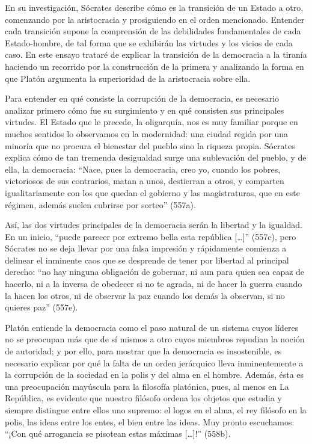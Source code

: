 En su investigación, Sócrates describe cómo
es la transición de un Estado a otro,
comenzando por la aristocracia y prosiguiendo
en el orden mencionado. Entender cada
transición supone la comprensión de las
debilidades fundamentales de cada
Estado-hombre, de tal forma que se exhibirán
las virtudes y los vicios de cada caso. En
este ensayo trataré de explicar la transición
de la democracia a la tiranía haciendo un
recorrido por la construcción de la primera y
analizando la forma en que Platón argumenta
la superioridad de la aristocracia sobre
ella.

Para entender en qué consiste la corrupción
de la democracia, es necesario analizar
primero cómo fue su surgimiento y en qué
consisten sus principales virtudes. El Estado
que le precede, la oligarquía, nos es muy
familiar porque en muchos sentidos lo
observamos en la modernidad: una ciudad
regida por una minoría que no procura el
bienestar del pueblo sino la riqueza propia.
Sócrates explica cómo de tan tremenda
desigualdad surge una sublevación del pueblo,
y de ella, la democracia: ``Nace, pues la
democracia, creo yo, cuando los pobres,
victoriosos de sus contrarios, matan a unos,
destierran a otros, y comparten
igualitariamente con los que quedan el
gobierno y las magistraturas, que en este
régimen, además suelen cubrirse por sorteo''
(557a).

Así, las dos virtudes principales de la
democracia serán la libertad y la igualdad.
En un inicio, ``puede parecer por extremo
bella esta república [\ldots{}]'' (557c),
pero Sócrates no se deja llevar por una falsa
impresión y rápidamente comienza a delinear
el inminente caos que se desprende de tener
por libertad al principal derecho: ``no hay
ninguna obligación de gobernar, ni aun para
quien sea capaz de hacerlo, ni a la inversa
de obedecer si no te agrada, ni de hacer la
guerra cuando la hacen los otros, ni de
observar la paz cuando los demás la observan,
si no quieres paz'' (557e).

Platón entiende la democracia como el paso
natural de un sistema cuyos líderes no se
preocupan más que de sí mismos a otro cuyos
miembros repudian la noción de autoridad; y
por ello, para mostrar que la democracia es
insostenible, es necesario explicar por qué
la falta de un orden jerárquico lleva
inminentemente a la corrupción de la sociedad
en la polis y del alma en el hombre. Además,
ésta es una preocupación mayúscula para la
filosofía platónica, pues, al menos en La
República, es evidente que nuestro filósofo
ordena los objetos que estudia y siempre
distingue entre ellos uno supremo: el logos
en el alma, el rey filósofo en la polis, las
ideas entre los entes, el bien entre las
ideas. Muy pronto escuchamos: ``¡Con qué
arrogancia se pisotean estas máximas
{[}\ldots{}]!'' (558b).

